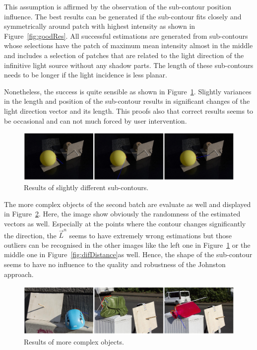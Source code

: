 This assumption is affirmed by the observation of the sub-contour position influence. The best results can be generated if the sub-contour fits closely and symmetrically around patch with highest intensity as shown in Figure~\ref{fig:goodRes}. All successful estimations are generated from sub-contours whose selections have the patch of maximum mean intensity almost in the middle and includes a selection of patches that are related to the light direction of the infinitive light source without any shadow parts. The length of these sub-contours needs to be longer if the light incidence is less planar. 

Nonetheless, the success is quite sensible as shown in Figure~\ref{fig:subcontourRes}. Slightly variances in the length and position of the sub-contour results in significant changes of the light direction vector and its length. This proofs also that correct results seems to be occasional and can not much forced by user intervention. 

\begin{figure}[H] 

	\center 
	\includegraphics[width=\linewidth]{Images/Lage_der Subcontour.jpg}
	\caption[Bildunterschrift]{Results of slightly different sub-contours.}	
		\label{fig:subcontourRes}	
\end{figure}

The more complex objects of the second batch are evaluate as well and displayed in Figure~\ref{fig:complexRes}. Here, the image show obviously the randomness of the estimated vectors as well. Especially at the points where the contour changes significantly the direction, the $\vec{L}^n$ seems to have extremely wrong estimations but those outliers can be recognised in the other images like the left one in Figure~\ref{fig:subcontourRes} or the middle one in Figure~\ref{fig:difDistance}as well. Hence, the shape of the sub-contour seems to have no influence to the quality and robustness of the Johnston approach.
\begin{figure}[H] 
	
	\center 
	\includegraphics[width=\linewidth]{Images/Komplex_res.jpg}
	\caption[Bildunterschrift]{Results of more complex objects.}	
	\label{fig:complexRes}	
\end{figure}




